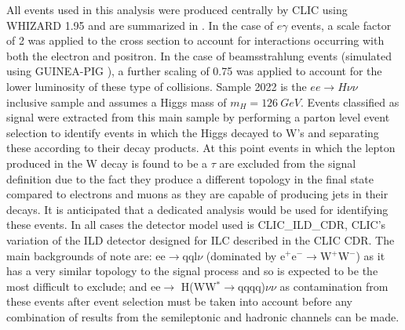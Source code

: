 All events used in this analysis were produced centrally by \ac{CLIC} using WHIZARD 1.95 \cite{Kilian:2007gr} and are summarized in . In the case of $e\gamma$ events, a scale factor of 2 was applied to the cross section to account for interactions occurring with both the electron and positron. In the case of beamsstrahlung events (simulated using GUINEA-PIG \cite{Schulte:382453}), a further scaling of 0.75 was applied to account for the lower luminosity of these type of collisions. Sample 2022 is the $ee\rightarrow H\nu\nu$ inclusive sample and assumes a Higgs mass of $m_H = 126~GeV$. Events classified as signal were extracted from this main sample by performing a parton level event selection to identify events in which the Higgs decayed to W's and separating these according to their decay products. At this point events in which the lepton produced in the W decay is found to be a $\tau$ are excluded from the signal definition due to the fact they produce a different topology in the final state compared to electrons and muons as they are capable of producing jets in their decays. It is anticipated that a dedicated analysis would be used for identifying these events. In all cases the detector model used is CLIC\_ILD\_CDR, CLIC's variation of the ILD detector designed for ILC described in the \ac{CLIC} CDR\cite{CDR}. The main backgrounds of note are: ee$\rightarrow$qql$\nu$ (dominated by e$^+$e$^-\rightarrow$W$^+$W$^-$) as it has a very similar topology to the signal process and so is expected to be the most difficult to exclude; and ee$\rightarrow$ H(WW$^*\rightarrow$qqqq)$\nu\nu$ as contamination from these events after event selection must be taken into account before any combination of results from the semileptonic and hadronic channels can be made.


